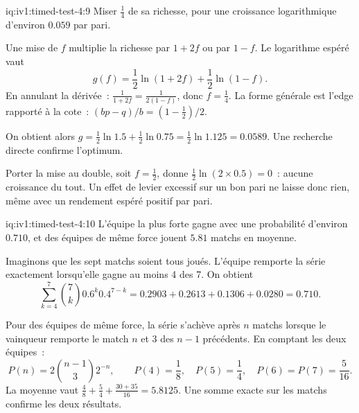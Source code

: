 \begin{solution}{iq:iv1:timed-test-4:9}
Miser $\frac14$ de sa richesse, pour une croissance logarithmique d'environ $0.059$ par pari.

Une mise de $f$ multiplie la richesse par $1 + 2f$ ou par $1 - f$. Le logarithme espéré vaut
\[
g(f) = \frac12\ln(1 + 2f) + \frac12\ln(1 - f).
\]
En annulant la dérivée~: $\frac{1}{1 + 2f} = \frac{1}{2(1 - f)}$, donc $f = \frac14$. La forme générale est l'edge rapporté à la cote~: $(bp - q)/b = (1 - \frac12)/2$.

On obtient alors $g = \frac12\ln 1.5 + \frac12\ln 0.75 = \frac12\ln 1.125 = 0.0589$. Une recherche directe confirme l'optimum.

Porter la mise au double, soit $f = \frac12$, donne $\frac12\ln(2 \times 0.5) = 0$~: aucune croissance du tout. Un effet de levier excessif sur un bon pari ne laisse donc rien, même avec un rendement espéré positif par pari.

\end{solution}

\begin{solution}{iq:iv1:timed-test-4:10}
L'équipe la plus forte gagne avec une probabilité d'environ $0.710$, et des équipes de même force jouent $5.81$ matchs en moyenne.

Imaginons que les sept matchs soient tous joués. L'équipe remporte la série exactement lorsqu'elle gagne au moins 4 des 7. On obtient
\[
\sum_{k = 4}^7\binom7k0.6^k0.4^{7 - k} = 0.2903 + 0.2613 + 0.1306 + 0.0280 = 0.710.
\]

Pour des équipes de même force, la série s'achève après $n$ matchs lorsque le vainqueur remporte le match $n$ et 3 des $n - 1$ précédents. En comptant les deux équipes~:
\[
P(n) = 2\binom{n - 1}{3}2^{-n}, \qquad P(4) = \frac18, \quad P(5) = \frac14, \quad P(6) = P(7) = \frac{5}{16}.
\]
La moyenne vaut $\frac{4}{8} + \frac{5}{4} + \frac{30 + 35}{16} = 5.8125$. Une somme exacte sur les matchs confirme les deux résultats.


\end{solution}

